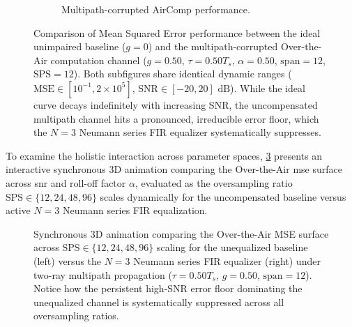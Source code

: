 \documentclass[Markos_Delaportas_1316.tex]{subfiles}
\begin{document}
\begin{figure}[htbp]
\begin{subfigure}{.48\linewidth}
        \caption{Multipath-corrupted AirComp performance.}
        \label{fig:ml_isi_rrc_fc_mse_12sps}
    \end{subfigure}
    \caption{Comparison of Mean Squared Error performance between the
        ideal unimpaired baseline ($g = 0$) and the multipath-corrupted
        Over-the-Air computation channel ($g = 0.50$, $\tau = 0.50 T_s$,
        $\alpha = 0.50$, $\text{span} = 12$, $\text{SPS} = 12$). Both subfigures
        share identical dynamic ranges ($\text{MSE} \in [10^{-1},
        2\times 10^5]$, $\text{SNR} \in [-20, 20]\text{ dB}$).
        While the ideal curve decays indefinitely with increasing
        SNR, the uncompensated multipath channel hits a pronounced,
        irreducible error floor, which the $N=3$ Neumann series FIR
    equalizer systematically suppresses.}
    \label{fig:ml_mse_comparison}
\end{figure}

To examine the holistic interaction across parameter spaces,
\cref{fig:isi_mse_span_comparison} presents an interactive
synchronous 3D animation comparing the Over-the-Air \gls{mse} surface
across \gls{snr} and roll-off factor $\alpha$,
evaluated as the oversampling ratio $\text{SPS} \in \{12, 24, 48,
96\}$ scales dynamically for the uncompensated baseline versus
active $N=3$ Neumann series FIR equalization.

\begin{figure}[htbp]
    \centering
    \caption{Synchronous 3D animation comparing the Over-the-Air MSE
        surface across $\text{SPS} \in \{12, 24, 48, 96\}$ scaling for the
        unequalized baseline (left) versus the $N=3$ Neumann series FIR
        equalizer (right) under two-ray multipath propagation
        ($\tau = 0.50 T_s$, $g = 0.50$, $\text{span} = 12$). Notice how the
        persistent high-SNR error floor dominating the unequalized
    channel is systematically suppressed across all oversampling ratios.}
    \label{fig:isi_mse_span_comparison}
\end{figure}
\end{document}

